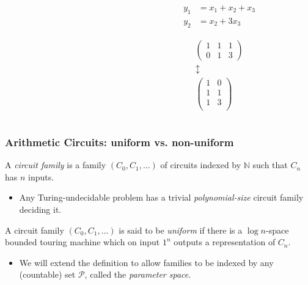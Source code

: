 \documentclass[10pt]{beamer}
\newcommand{\N}{\mathbb{N}}
\begin{document}
\begin{frame}
\begin{columns}
\begin{column}{0.6\textwidth}
    \end{column}
    \begin{column}{0.4\textwidth}
      \begin{align*}
        y_1 &= x_1 + x_2 + x_3\\
        y_2 &= x_2 + 3x_3
      \end{align*}
      
      \Large
      \begin{gather*}
        \begin{pmatrix}
          1 & 1 & 1\\
          0 & 1 & 3
        \end{pmatrix}\\
        \updownarrow\\
        \begin{pmatrix}
          1 & 0\\
          1 & 1\\
          1 & 3\\
        \end{pmatrix}
      \end{gather*}
    \end{column}
  \end{columns}
\end{frame}


\begin{frame}
  \frametitle{Arithmetic Circuits: uniform vs. non-uniform}

  \begin{definition}
    A \emph{circuit family} is a family $(C_0,C_1,\ldots)$ of circuits
    indexed by $\N$ such that $C_n$ has $n$ inputs.
  \end{definition}
  
  \begin{itemize}
  \item \alert{Any Turing-undecidable problem has a trivial
      \emph{polynomial-size} circuit family deciding it.}
  \end{itemize}

  \begin{definition}
    A circuit family $(C_0,C_1,\ldots)$ is said to be \emph{uniform}
    if there is a $\log n$-space bounded touring machine which on
    input $1^n$ outputs a representation of $C_n$.
  \end{definition}

  \begin{itemize}
  \item We will extend the definition to allow families to be indexed
    by any (countable) set $\mathcal{P}$, called the \emph{parameter
      space}.
  \end{itemize}
\end{frame}
\end{document}
